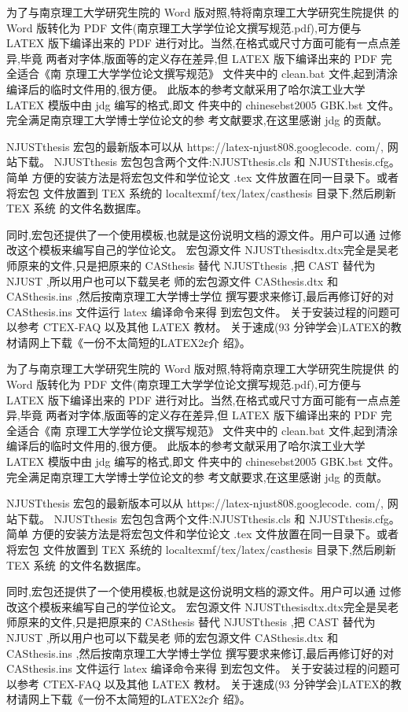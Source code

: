 为了与南京理工大学研究生院的 Word 版对照,特将南京理工大学研究生院提供 的 Word 版转化为 PDF 文件(南京理工大学学位论文撰写规范.pdf),可方便与 LATEX 版下编译出来的 PDF 进行对比。当然,在格式或尺寸方面可能有一点点差异,毕竟 两者对字体,版面等的定义存在差异,但 LATEX 版下编译出来的 PDF 完全适合《南 京理工大学学位论文撰写规范》
文件夹中的 clean.bat 文件,起到清涂编译后的临时文件用的,很方便。
此版本的参考文献采用了哈尔滨工业大学 LATEX 模版中由 jdg 编写的格式,即文 件夹中的 chinesebst2005 GBK.bst 文件。完全满足南京理工大学博士学位论文的参 考文献要求,在这里感谢 jdg 的贡献。

NJUSTthesis 宏包的最新版本可以从 https://latex-njust808.googlecode. com/, 网站下载。
NJUSTthesis 宏包包含两个文件:NJUSTthesis.cls 和 NJUSTthesis.cfg。简单 方便的安装方法是将宏包文件和学位论文 .tex 文件放置在同一目录下。或者将宏包 文件放置到 TEX 系统的 localtexmf/tex/latex/casthesis 目录下,然后刷新 TEX 系统 的文件名数据库。

同时,宏包还提供了一个使用模板,也就是这份说明文档的源文件。用户可以通 过修改这个模板来编写自己的学位论文。
宏包源文件 NJUSTthesisdtx.dtx完全是吴老师原来的文件,只是把原来的 CASthesis 替代 NJUSTthesis ,把 CAST 替代为 NJUST ,所以用户也可以下载吴老 师的宏包源文件 CASthesis.dtx 和 CASthesis.ins ,然后按南京理工大学博士学位 撰写要求来修订,最后再修订好的对 CASthesis.ins 文件运行 latex 编译命令来得 到宏包文件。
关于安装过程的问题可以参考 CTEX-FAQ 以及其他 LATEX 教材。 关于速成(93 分钟学会)LATEX的教材请网上下载《一份不太简短的LATEX2ε介
绍》。

为了与南京理工大学研究生院的 Word 版对照,特将南京理工大学研究生院提供 的 Word 版转化为 PDF 文件(南京理工大学学位论文撰写规范.pdf),可方便与 LATEX 版下编译出来的 PDF 进行对比。当然,在格式或尺寸方面可能有一点点差异,毕竟 两者对字体,版面等的定义存在差异,但 LATEX 版下编译出来的 PDF 完全适合《南 京理工大学学位论文撰写规范》
文件夹中的 clean.bat 文件,起到清涂编译后的临时文件用的,很方便。
此版本的参考文献采用了哈尔滨工业大学 LATEX 模版中由 jdg 编写的格式,即文 件夹中的 chinesebst2005 GBK.bst 文件。完全满足南京理工大学博士学位论文的参 考文献要求,在这里感谢 jdg 的贡献。

NJUSTthesis 宏包的最新版本可以从 https://latex-njust808.googlecode. com/, 网站下载。
NJUSTthesis 宏包包含两个文件:NJUSTthesis.cls 和 NJUSTthesis.cfg。简单 方便的安装方法是将宏包文件和学位论文 .tex 文件放置在同一目录下。或者将宏包 文件放置到 TEX 系统的 localtexmf/tex/latex/casthesis 目录下,然后刷新 TEX 系统 的文件名数据库。

同时,宏包还提供了一个使用模板,也就是这份说明文档的源文件。用户可以通 过修改这个模板来编写自己的学位论文。
宏包源文件 NJUSTthesisdtx.dtx完全是吴老师原来的文件,只是把原来的 CASthesis 替代 NJUSTthesis ,把 CAST 替代为 NJUST ,所以用户也可以下载吴老 师的宏包源文件 CASthesis.dtx 和 CASthesis.ins ,然后按南京理工大学博士学位 撰写要求来修订,最后再修订好的对 CASthesis.ins 文件运行 latex 编译命令来得 到宏包文件。
关于安装过程的问题可以参考 CTEX-FAQ 以及其他 LATEX 教材。 关于速成(93 分钟学会)LATEX的教材请网上下载《一份不太简短的LATEX2ε介
绍》。

